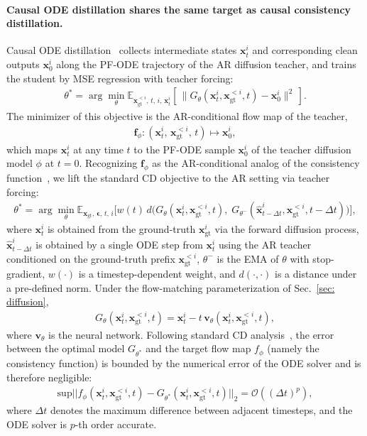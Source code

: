 \documentclass{llmxive}
\providecommand{\bm}[1]{\boldsymbol{#1}}
\providecommand{\vepsilon}{{\bm{\epsilon}}}
\providecommand{\vf}{{\bm{f}}}
\providecommand{\vv}{{\bm{v}}}
\providecommand{\vx}{{\bm{x}}}
\providecommand{\gO}{{\mathcal{O}}}
\begin{document}
\paragraph{Causal ODE distillation shares the same target as causal consistency distillation.}
Causal ODE distillation~\cite{zhu2026causal} collects intermediate states $\vx_t^i$ and corresponding clean outputs $\vx_0^i$ along the PF-ODE trajectory of the AR diffusion teacher, and trains the student by MSE regression with teacher forcing:
\begin{align}
    \theta^*=\arg\min_\theta \mathbb{E}_{\vx_{\mathrm{gt}}^{<i},\, t,\, i,\, \vx_t^i}\left[\,\|G_\theta(\vx_t^i,\vx_{\mathrm{gt}}^{<i}, t)-\vx_0^i\|^2\,\right].
\end{align}
The minimizer of this objective is the AR-conditional flow map of the teacher,
\begin{align}
    \vf_\phi:(\vx_t^i,\,\vx_{\mathrm{gt}}^{<i},\,t)\mapsto \vx_0^i,
\end{align}
which maps $\vx_t^i$ at any time $t$ to the PF-ODE sample $\vx_0^i$ of the teacher diffusion model $\phi$ at $t=0$. 
Recognizing $\vf_\phi$ as the AR-conditional analog of the consistency function~\cite{song2023consistency,song2023improved,wang2024phased,lu2024simplifying,zheng2025large}, we lift the standard CD objective to the AR setting via teacher forcing:
\begin{align}
\label{eq:causal-cd}
\theta^*=\arg\min_\theta \mathbb{E}_{\vx_\text{gt},\,\vepsilon,\,t,\,i}\Big[w(t)\,d\big(G_\theta(\vx_t^i,\vx_\text{gt}^{<i}, t),\; G_{\theta^-}(\hat{\vx}^i_{t-\Delta t},\vx_\text{gt}^{<i}, t-\Delta t)\big)\Big],
\end{align}
where $\vx_t^i$ is obtained from the ground-truth $\vx_\text{gt}^i$ via the forward diffusion process, $\hat{\vx}^i_{t-\Delta t}$ is obtained by a single ODE step from $\vx_t^i$ using the AR teacher conditioned on the ground-truth prefix $\vx_\text{gt}^{<i}$, $\theta^-$ is the EMA of $\theta$ with stop-gradient, $w(\cdot)$ is a timestep-dependent weight, and $d(\cdot,\cdot)$ is a distance under a pre-defined norm. Under the flow-matching parameterization of Sec.~\ref{sec: diffusion},
\begin{align}
G_\theta(\vx_t^i,\vx_\text{gt}^{<i},t) = \vx_t^i - t\,\vv_\theta(\vx_t^i,\vx_\text{gt}^{<i},t),
\end{align}
where $\vv_\theta$ is the neural network. Following standard CD analysis~\cite{song2023consistency}, the error between the optimal model $G_{\theta^*}$ and the target flow map $f_\phi$ (namely the consistency function) is bounded by the numerical error of the ODE solver and is therefore negligible:
\begin{align}
    \mathrm{sup}||f_\phi(\vx_t^i, \vx_{\mathrm{gt}}^{<i},t) - G_{\theta^*}(\vx_t^i, \vx_{\mathrm{gt}}^{<i},t)||_2 = \gO((\Delta t)^p),
\end{align}
where $\Delta t$ denotes the maximum difference between adjacent timesteps, and the ODE solver is $p$-th order accurate.
\end{document}
